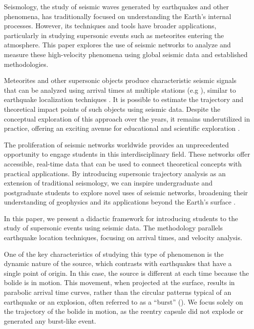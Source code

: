 \documentclass[linenum]{SSA-SRL}
\begin{document}
Seismology, the study of seismic waves generated by earthquakes and other phenomena, has traditionally focused on understanding the Earth’s internal processes. However, its techniques and tools have broader applications, particularly in studying supersonic events such as meteorites entering the atmosphere. This paper explores the use of seismic networks to analyze and measure these high-velocity phenomena using global seismic data and established methodologies.

Meteorites and other supersonic objects produce characteristic seismic signals that can be analyzed using arrival times at multiple stations (e.g \citealp{Arrowsmith_2007,Berngardt_2015,de_Groot_Hedlin_2018,de_Groot_Hedlin_2014,Hedlin_2013,Pujol_2005,Qamar_1995,Stevanovi__2017,Brown_2003,
Edwards_2007,Edwards_2004}), similar to earthquake localization techniques \citep{Pujol_2006}. It is possible to estimate the trajectory and theoretical impact points of such objects using seismic data. Despite the conceptual exploration of this approach over the years, it remains underutilized in practice, offering an exciting avenue for educational and scientific exploration \citep{Silber_2024}.

The proliferation of seismic networks worldwide \citep{Ringler_2022} provides an unprecedented opportunity to engage students in this interdisciplinary field. These networks offer accessible, real-time data that can be used to connect theoretical concepts with practical applications. By introducing supersonic trajectory analysis as an extension of traditional seismology, we can inspire undergraduate and postgraduate students to explore novel uses of seismic networks, broadening their understanding of geophysics and its applications beyond the Earth’s surface \citep{KARAFYLLIDIS2024UNV}.

In this paper, we present a didactic framework for introducing students to the study of supersonic events using seismic data. The methodology parallels earthquake location techniques, focusing on arrival times, and velocity analysis. 

One of the key characteristics of studying this type of phenomenon is the dynamic nature of the source, which contrasts with earthquakes that have a single point of origin. In this case, the source is different at each time because the bolide is in motion. This movement, when projected at the surface, results in parabolic arrival time curves, rather than the circular patterns typical of an earthquake or an explosion, often referred to as a “burst” (\citealp {D_Auria_2006, Stevanovi__2017, Edwards_2004}).  We focus solely on the trajectory of the bolide in motion, as the reentry capsule did not explode or generated any burst-like event.
\end{document}
